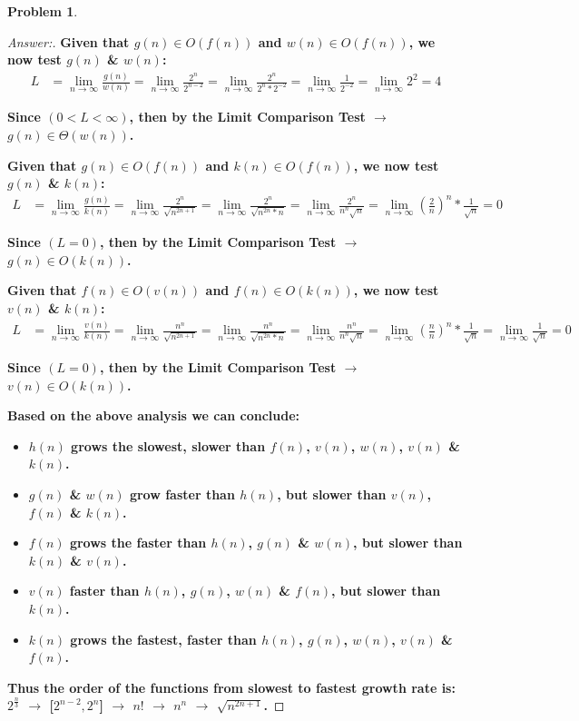 \documentclass[11pt]{article}
\theoremstyle{definition}
\theoremstyle{definition}
\newtheorem{required}{Problem}
\theoremstyle{definition}
\begin{document}
\begin{required}
\begin{enumerate}[label=(\alph*)]
\begin{proof}[Answer:]
\item \textbf{Given that $g(n) \in O(f(n))$ and $w(n) \in O(f(n))$, we now test $g(n)$ \& $w(n)$:}
\begin{align*}
L &= \lim_{n \to \infty} \frac{g(n)}{w(n)} = \lim_{n \to \infty} \frac{2^n}{2^{n - 2}} = \lim_{n \to \infty} \frac{2^n}{2^n * 2^{-2}} = \lim_{n \to \infty} \frac{1}{2^{-2}} = \lim_{n \to \infty} 2^2 = 4
\end{align*}
\item \textbf{Since $(0 < L < \infty)$, then by the Limit Comparison Test $\to$ $g(n) \in \Theta(w(n))$.}

\item \textbf{Given that $g(n) \in O(f(n))$ and $k(n) \in O(f(n))$, we now test $g(n)$ \& $k(n)$:}
\begin{align*}
L &= \lim_{n \to \infty} \frac{g(n)}{k(n)} = \lim_{n \to \infty} \frac{2^n}{\sqrt{n^{2n+1}}} = \lim_{n \to \infty} \frac{2^n}{\sqrt{n^{2n} * n}} = \lim_{n \to \infty} \frac{2^n}{n^n \sqrt{n}} = \lim_{n \to \infty} (\frac{2}{n})^n * \frac{1}{\sqrt{n}} = 0
\end{align*}
\item \textbf{Since $(L = 0)$, then by the Limit Comparison Test $\to$ $g(n) \in O(k(n))$.}

\item \textbf{Given that $f(n) \in O(v(n))$ and $f(n) \in O(k(n))$, we now test $v(n)$ \& $k(n)$:}
\begin{align*}
L &= \lim_{n \to \infty} \frac{v(n)}{k(n)} = \lim_{n \to \infty} \frac{n^n}{\sqrt{n^{2n+1}}} = \lim_{n \to \infty} \frac{n^n}{\sqrt{n^{2n} * n}} = \lim_{n \to \infty} \frac{n^n}{n^n \sqrt{n}} = \lim_{n \to \infty} (\frac{n}{n})^n * \frac{1}{\sqrt{n}} = \lim_{n \to \infty} \frac{1}{\sqrt{n}} = 0
\end{align*}
\item \textbf{Since $(L = 0)$, then by the Limit Comparison Test $\to$ $v(n) \in O(k(n))$.}

\item \textbf{Based on the above analysis we can conclude:}
\begin{itemize}
\item \textbf{$h(n)$ grows the slowest, slower than $f(n)$, $v(n)$, $w(n)$, $v(n)$ \& $k(n)$.}
\item \textbf{$g(n)$ \& $w(n)$ grow faster than $h(n)$, but slower than $v(n)$, $f(n)$ \& $k(n)$.}
\item \textbf{$f(n)$ grows the faster than $h(n)$, $g(n)$ \& $w(n)$, but slower than $k(n)$ \& $v(n)$.}
\item \textbf{$v(n)$ faster than $h(n)$, $g(n)$, $w(n)$ \& $f(n)$, but slower than $k(n)$.}
\item \textbf{$k(n)$ grows the fastest, faster than $h(n)$, $g(n)$, $w(n)$, $v(n)$ \& $f(n)$.}
\end{itemize}
\item \textbf{Thus the order of the functions from slowest to fastest growth rate is: $2^{\frac{n}{3}}$ $\to$ [$2^{n-2}, 2^n$] $\to$ $n!$ $\to$ $n^n$ $\to$ $\sqrt{n^{2n+1}}$.}


\end{proof}
\end{enumerate}
\end{required}
\end{document}
